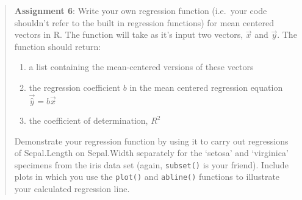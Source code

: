 \begin{quote}
\textbf{Assignment 6}: Write your own regression function (i.e.~your
code shouldn't refer to the built in regression functions) for mean
centered vectors in R. The function will take as it's input two vectors,
$\vec{x}$ and $\vec{y}$. The function should return:

\begin{enumerate}[1.]
\item
  a list containing the mean-centered versions of these vectors
\item
  the regression coefficient $b$ in the mean centered regression
  equation $\vec{\widehat{y}} = b\vec{x}$
\item
  the coefficient of determination, $R^2$
\end{enumerate}
Demonstrate your regression function by using it to carry out
regressions of Sepal.Length on Sepal.Width separately for the `setosa'
and `virginica' specimens from the iris data set (again,
\lstinline!subset()! is your friend). Include plots in which you use the
\lstinline!plot()! and \lstinline!abline()! functions to illustrate your
calculated regression line.

\end{quote}

